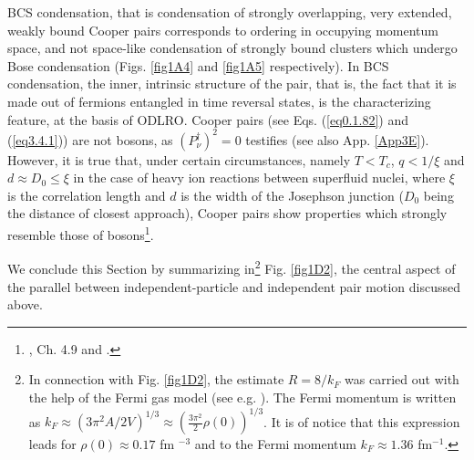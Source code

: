  BCS condensation, that is condensation of strongly overlapping, very extended, weakly bound Cooper pairs corresponds to ordering in occupying momentum space, and not space-like condensation of strongly bound clusters which undergo Bose condensation (Figs. \ref{fig1A4} and \ref{fig1A5} respectively). In BCS condensation, the inner, intrinsic structure of the pair, that is, the fact that it is made out of fermions entangled in time reversal states, is the characterizing feature, at the basis of ODLRO. 
 Cooper pairs (see Eqs. (\ref{eq0.1.82}) and (\ref{eq3.4.1})) are not bosons, as $(P_\nu^{\dagger})^2=0$ 
 testifies (see also App. \ref{App3E}). However, it is true that, under certain circumstances, namely $T<T_c$, $q<1/\xi$ and $d\approx D_0\leq\xi$ in the case of heavy ion reactions between superfluid nuclei, where $\xi$ is the correlation length and $d$ is the width of the  Josephson junction ($D_0$ being the distance of closest approach), Cooper pairs show properties which strongly resemble those of bosons\footnote{\label{f45C3} \cite{terHaar:95b}, \cite{TerHaar:95} Ch. 4.9 and \cite{Ehrenfest:31}.}.
 

We conclude this Section by summarizing in\footnote{In connection with  Fig. \ref{fig1D2}, the estimate $R=8/k_F$ was carried out with the help of the Fermi gas model (see e.g. \cite{Bohr:69}). The Fermi momentum is written as $k_F\approx (3\pi^2 A/2V)^{1/3}\approx (\frac{3\pi^2}{2}\rho(0))^{1/3}$. It is of notice that this expression leads for $\rho(0)\approx 0.17$ fm $^{-3}$ and to the Fermi momentum $k_F\approx 1.36 $ fm$^{-1}$.} Fig. \ref{fig1D2}, the central aspect of the parallel between independent-particle and independent pair motion discussed above. 





